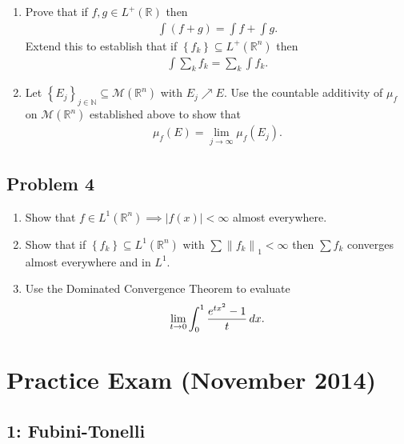 \begin{enumerate}
\def\labelenumi{\alph{enumi}.}
\item
  Prove that if \(f, g\in L^+({\mathbb{R}})\) then
  \begin{align*}
  \int(f +g) = \int f + \int g
  .\end{align*}
  Extend this to establish that if
  \(\left\{{ f_k}\right\} \subseteq L^+({\mathbb{R}}^n)\) then
  \begin{align*}
    \int \sum_k f_k = \sum_k \int f_k
    .\end{align*}
\item
  Let
  \(\left\{{E_j}\right\}_{j\in {\mathbb{N}}} \subseteq \mathcal{M}({\mathbb{R}}^n)\)
  with \(E_j \nearrow E\). Use the countable additivity of \(\mu_f\) on
  \(\mathcal{M}({\mathbb{R}}^n)\) established above to show that
  \begin{align*}
    \mu_f(E) = \lim_{j\to \infty } \mu_f(E_j)
    .\end{align*}
\end{enumerate}

\hypertarget{problem-4-2}{%
\subsection{Problem 4}\label{problem-4-2}}

\begin{enumerate}
\def\labelenumi{\alph{enumi}.}
\item
  Show that
  \(f\in L^1({\mathbb{R}}^n) \implies {\left\lvert {f(x)} \right\rvert} < \infty\)
  almost everywhere.
\item
  Show that if \(\left\{{f_k}\right\} \subseteq L^1({\mathbb{R}}^n)\)
  with \(\sum {\left\lVert {f_k} \right\rVert}_1 < \infty\) then
  \(\sum f_k\) converges almost everywhere and in \(L^1\).
\item
  Use the Dominated Convergence Theorem to evaluate
  \begin{align*}
  \lim_{t\to 0} \int_0^1 {e^{tx^2} - 1 \over t} \,dx
  .\end{align*}
\end{enumerate}

\hypertarget{practice-exam-november-2014-1}{%
\section{Practice Exam (November
2014)}\label{practice-exam-november-2014-1}}

\hypertarget{fubini-tonelli-1}{%
\subsection{1: Fubini-Tonelli}\label{fubini-tonelli-1}}

